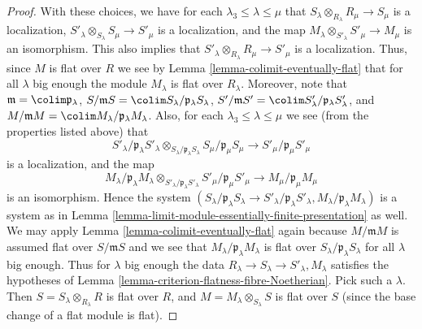 \begin{proof}
\medskip\noindent
With these choices, we have for each $\lambda_3 \leq \lambda \leq \mu$
that $S_\lambda \otimes_{R_{\lambda}} R_\mu \to S_\mu$ is a localization,
$S'_\lambda \otimes_{S_{\lambda}} S_\mu \to S'_\mu$ is a localization, and
the map $M_\lambda \otimes_{S'_\lambda} S'_\mu \to M_\mu$ is an
isomorphism. This also implies that
$S'_\lambda \otimes_{R_{\lambda}} R_\mu \to S'_\mu$ is a localization.
Thus, since $M$ is flat over $R$ we see by
Lemma \ref{lemma-colimit-eventually-flat} that
for all $\lambda$ big enough the module $M_\lambda$ is
flat over $R_\lambda$.
Moreover, note that
$
\mathfrak m = \colim \mathfrak p_\lambda
$,
$
S/\mathfrak mS = \colim S_\lambda/\mathfrak p_\lambda S_\lambda
$,
$
S'/\mathfrak mS' = \colim S'_\lambda/\mathfrak p_\lambda S'_\lambda
$,
and
$
M/\mathfrak mM = \colim M_\lambda/\mathfrak p_\lambda M_\lambda
$. Also, for each $\lambda_3 \leq \lambda \leq \mu$ we see (from the
properties listed above) that
$$
S'_\lambda/\mathfrak p_\lambda S'_\lambda
\otimes_{S_{\lambda}/\mathfrak p_\lambda S_\lambda}
S_\mu/\mathfrak p_\mu S_\mu
\longrightarrow
S'_\mu/\mathfrak p_\mu S'_\mu
$$
is a localization, and the map
$$
M_\lambda / \mathfrak p_\lambda M_\lambda
\otimes_{S'_\lambda/\mathfrak p_\lambda S'_\lambda}
S'_\mu /\mathfrak p_\mu S'_\mu
\longrightarrow
M_\mu/\mathfrak p_\mu M_\mu
$$
is an isomorphism. Hence the system
$(S_\lambda/\mathfrak p_\lambda S_\lambda \to
S'_\lambda/\mathfrak p_\lambda S'_\lambda,
M_\lambda/\mathfrak p_\lambda M_\lambda)$
is a system as in
Lemma \ref{lemma-limit-module-essentially-finite-presentation} as well.
We may apply Lemma \ref{lemma-colimit-eventually-flat} again because
$M/\mathfrak m M$ is assumed flat over $S/\mathfrak mS$ and we see that
$M_\lambda/\mathfrak p_\lambda M_\lambda$ is flat over
$S_\lambda/\mathfrak p_\lambda S_\lambda$ for all $\lambda$ big enough.
Thus for $\lambda$ big enough the data
$R_\lambda \to S_\lambda \to S'_\lambda, M_\lambda$ satisfies
the hypotheses of Lemma \ref{lemma-criterion-flatness-fibre-Noetherian}.
Pick such a $\lambda$. Then $S = S_\lambda \otimes_{R_\lambda} R$
is flat over $R$, and $M = M_\lambda \otimes_{S_\lambda} S$
is flat over $S$ (since the base change of a flat module is flat).
\end{proof}